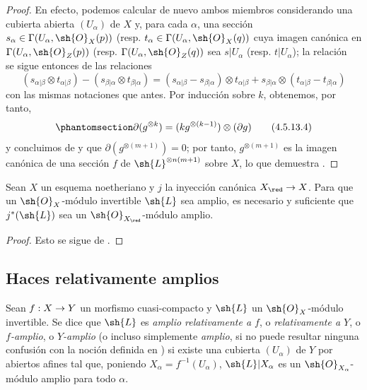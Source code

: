 \documentclass[oneside,10pt]{amsart}
\makeatletter
\newcommand{\ega@arrow}[2]{\mathchoice{#1}{#2}{#2}{#2}}
\renewcommand{\to}{\ega@arrow{\longrightarrow}{\rightarrow}}
\newcommand{\oldpage}[2][]{\marginnote{\normalfont\footnotesize\textbf{#1}~|~#2}\ignorespaces}
\let\EGAOriginalLabel\label
\renewcommand{\label}[1]{\phantomsection\EGAOriginalLabel{#1}}
\makeatother
\begin{document}
\begin{proof}
  En efecto, podemos calcular de nuevo ambos miembros considerando una cubierta abierta $(U_\alpha)$ de $X$ y, para cada $\alpha$, una sección $s_\alpha\in\Gamma(U_\alpha,\sh{O}_X(p))$ (resp. $t_\alpha\in\Gamma(U_\alpha,\sh{O}_X(q))$ cuya imagen canónica en $\Gamma(U_\alpha,\sh{O}_Z(p))$ (resp. $\Gamma(U_\alpha,\sh{O}_Z(q))$ sea $s|U_\alpha$ (resp. $t|U_\alpha$);
  la relación~ se sigue entonces de las relaciones
  \[
    (s_{\alpha|\beta}\otimes t_{\alpha|\beta})-(s_{\beta|\alpha}\otimes t_{\beta|\alpha})
    =(s_{\alpha|\beta}-s_{\beta|\alpha})\otimes t_{\alpha|\beta}+s_{\beta|\alpha}\otimes(t_{\alpha|\beta}-t_{\beta|\alpha})
  \]
  con las mismas notaciones que antes.
  Por inducción sobre $k$, obtenemos, por tanto,
  \[
  \label{II.4.5.13.4}
    \partial(g^{\otimes k})=(kg^{\otimes(k-1)})\otimes(\partial g)
  \tag{4.5.13.4}
  \]
\oldpage[II]{89}
  y concluimos de  y  que $\partial(g^{\otimes(m+1)})=0$;
  por tanto, $g^{\otimes(m+1)}$ es la imagen canónica de una sección $f$ de $\sh{L}^{\otimes n(m+1)}$ sobre $X$, lo que demuestra .
\end{proof}

\begin{corollary}[4.5.14]
\label{II.4.5.14}
Sean $X$ un esquema noetheriano y $j$ la inyección canónica $X_\red\to X$.
Para que un $\sh{O}_X$-módulo invertible $\sh{L}$ sea amplio, es necesario y suficiente que $j^*(\sh{L})$ sea un $\sh{O}_{X_\red}$-módulo amplio.
\end{corollary}

\begin{proof}
Esto se sigue de .
\end{proof}

\subsection{Haces relativamente amplios}
\label{subsection:II.4.6}

\begin{definition}[4.6.1]
\label{II.4.6.1}
Sean $f:X\to Y$ un morfismo cuasi-compacto y $\sh{L}$ un $\sh{O}_X$-módulo invertible.
Se dice que $\sh{L}$ es \emph{amplio relativamente a $f$}, o \emph{relativamente a $Y$}, o \emph{$f$-amplio}, o \emph{$Y$-amplio} \textup{(o incluso simplemente \emph{amplio}, si no puede resultar ninguna confusión con la noción definida en )} si existe una cubierta $(U_\alpha)$ de $Y$ por abiertos afines tal que, poniendo $X_\alpha=f^{-1}(U_\alpha)$, $\sh{L}|X_\alpha$ es un $\sh{O}_{X_\alpha}$-módulo amplio para todo $\alpha$.
\end{definition}
\end{document}
